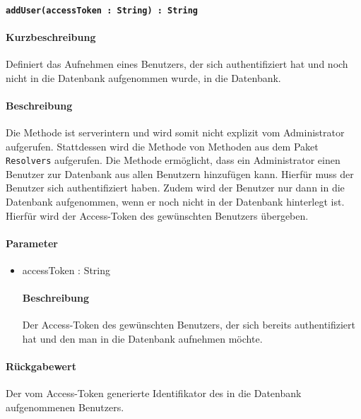 \paragraph{\texttt{addUser(accessToken : String) : String}}%
\paragraph*{Kurzbeschreibung}
Definiert das Aufnehmen eines Benutzers, der sich authentifiziert hat und noch nicht in die Datenbank aufgenommen wurde, in die Datenbank.
\paragraph*{Beschreibung}
Die Methode ist serverintern und wird somit nicht explizit vom Administrator aufgerufen.
Stattdessen wird die Methode von Methoden aus dem Paket \texttt{Resolvers} aufgerufen.
Die Methode ermöglicht, dass ein Administrator einen Benutzer zur Datenbank aus allen Benutzern hinzufügen kann. Hierfür muss der Benutzer sich authentifiziert haben. 
Zudem wird der Benutzer nur dann in die Datenbank aufgenommen, wenn er noch nicht in der Datenbank hinterlegt ist.
Hierfür wird der Access-Token des gewünschten Benutzers übergeben.
\paragraph*{Parameter}
\begin{itemize}
    \item accessToken : String
    		\paragraph*{Beschreibung}
    		Der Access-Token des gewünschten Benutzers, der sich bereits authentifiziert hat und den man in die Datenbank aufnehmen möchte.
\end{itemize}
\paragraph*{Rückgabewert}
Der vom Access-Token generierte Identifikator des in die Datenbank aufgenommenen Benutzers.
